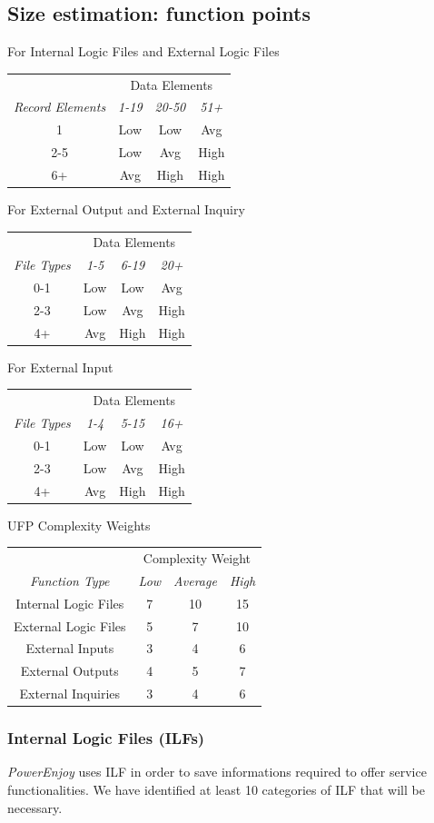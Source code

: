 \documentclass[english]{article}
\newenvironment{fptable}[2]{
	\begin{center}
	#1
	\begin{longtable}{|c|c|c|c|}
	\hline 
	&
	\multicolumn{3}{|c|}{{#2}}\\\nopagebreak\hline	
}{
	\hline\end{longtable}\end{center}
}
\newcommand{\fpvalues}[4]{%
	\textit{#1} & \textit{#2}& \textit{#3}& \textit{#4}\\\nopagebreak\hline
}
\newcommand{\powerenjoy}{\textit{PowerEnjoy }}
\begin{document}
\subsection{Size estimation: function points}
\begin{fptable}{For Internal Logic Files and External Logic Files}{Data Elements}
\fpvalues{Record Elements}{1-19}{20-50}{51+}
1 & Low & Low & Avg\\
2-5 & Low & Avg & High\\
6+ & Avg & High & High\\
\end{fptable}

\begin{fptable}{For External Output and External Inquiry}{Data Elements}
\fpvalues{File Types}{1-5}{6-19}{20+}
0-1 & Low & Low & Avg\\
2-3 & Low & Avg & High\\
4+ & Avg & High & High\\
\end{fptable}

\begin{fptable}{For External Input}{Data Elements}
\fpvalues{File Types}{1-4}{5-15}{16+}
0-1 & Low & Low & Avg\\
2-3 & Low & Avg & High\\
4+ & Avg & High & High\\
\end{fptable}

\begin{fptable}{UFP Complexity Weights}{Complexity Weight}
\fpvalues{Function Type}{Low}{Average}{High}
Internal Logic Files & 7 & 10 & 15\\
External Logic Files & 5 & 7 & 10\\
External Inputs & 3 & 4 & 6\\
External Outputs & 4 & 5 & 7\\
External Inquiries & 3 & 4 & 6\\
\end{fptable}

\subsubsection{Internal Logic Files (ILFs)}
\powerenjoy uses ILF in order to save informations required to offer service functionalities.
We have identified at least 10 categories of ILF that will be necessary.
\end{document}
